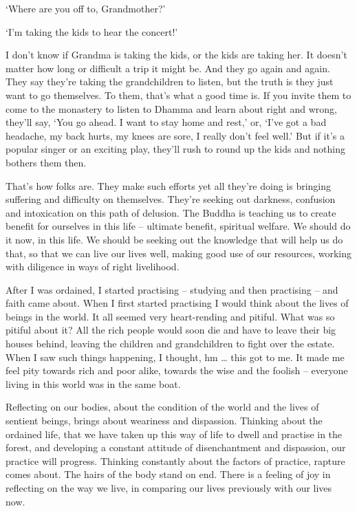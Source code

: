 `Where are you off to, Grandmother?' 

`I'm taking the kids to hear the concert!' 

I don't know if Grandma is taking the kids, or the kids are taking her. It doesn't matter how long or difficult a trip it might be. And they go again and again. They say they're taking the grandchildren to listen, but the truth is they just want to go themselves. To them, that's what a good time is. If you invite them to come to the monastery to listen to Dhamma and learn about right and wrong, they'll say, `You go ahead. I want to stay home and rest,' or, `I've got a bad headache, my back hurts, my knees are sore, I really don't feel well.' But if it's a popular singer or an exciting play, they'll rush to round up the kids and nothing bothers them then. 

That's how folks are. They make such efforts yet all they're doing is bringing suffering and difficulty on themselves. They're seeking out darkness, confusion and intoxication on this path of delusion. The Buddha is teaching us to create benefit for ourselves in this life -- ultimate benefit, spiritual welfare. We should do it now, in this life. We should be seeking out the knowledge that will help us do that, so that we can live our lives well, making good use of our resources, working with diligence in ways of right livelihood. 

After I was ordained, I started practising -- studying and then practising -- and faith came about. When I first started practising I would think about the lives of beings in the world. It all seemed very heart-rending and pitiful. What was so pitiful about it? All the rich people would soon die and have to leave their big houses behind, leaving the children and grandchildren to fight over the estate. When I saw such things happening, I thought, hm \ldots{} this got to me. It made me feel pity towards rich and poor alike, towards the wise and the foolish -- everyone living in this world was in the same boat. 

Reflecting on our bodies, about the condition of the world and the lives of sentient beings, brings about weariness and dispassion. Thinking about the ordained life, that we have taken up this way of life to dwell and practise in the forest, and developing a constant attitude of disenchantment and dispassion, our practice will progress. Thinking constantly about the factors of practice, rapture comes about. The hairs of the body stand on end. There is a feeling of joy in reflecting on the way we live, in comparing our lives previously with our lives now. 

